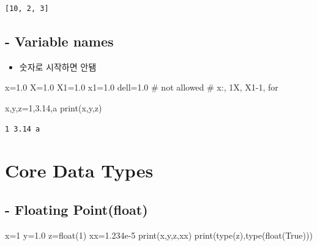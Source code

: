 \documentclass[
  letterpaper,
  DIV=11,
  numbers=noendperiod]{scrreprt}
\newenvironment{Shaded}{\begin{snugshade}}{\end{snugshade}}
\newcommand{\BuiltInTok}[1]{\textcolor[rgb]{0.00,0.23,0.31}{#1}}
\newcommand{\CommentTok}[1]{\textcolor[rgb]{0.37,0.37,0.37}{#1}}
\newcommand{\DecValTok}[1]{\textcolor[rgb]{0.68,0.00,0.00}{#1}}
\newcommand{\FloatTok}[1]{\textcolor[rgb]{0.68,0.00,0.00}{#1}}
\newcommand{\NormalTok}[1]{\textcolor[rgb]{0.00,0.23,0.31}{#1}}
\newcommand{\OperatorTok}[1]{\textcolor[rgb]{0.37,0.37,0.37}{#1}}
\newcommand{\StringTok}[1]{\textcolor[rgb]{0.13,0.47,0.30}{#1}}
\newcommand{\VariableTok}[1]{\textcolor[rgb]{0.07,0.07,0.07}{#1}}
\providecommand{\tightlist}{%
  \setlength{\itemsep}{0pt}\setlength{\parskip}{0pt}}\usepackage{longtable,booktabs,array}
\begin{document}
\begin{verbatim}
[10, 2, 3]
\end{verbatim}

\subsection{- Variable names}\label{variable-names}

\begin{itemize}
\tightlist
\item
  숫자로 시작하면 안됌
\end{itemize}

\begin{Shaded}
\begin{Highlighting}[]
\NormalTok{x}\OperatorTok{=}\FloatTok{1.0}
\NormalTok{X}\OperatorTok{=}\FloatTok{1.0}
\NormalTok{X1}\OperatorTok{=}\FloatTok{1.0}
\NormalTok{x1}\OperatorTok{=}\FloatTok{1.0}
\NormalTok{dell}\OperatorTok{=}\FloatTok{1.0}
\CommentTok{\# not allowed}
\CommentTok{\# x:, 1X, X1{-}1, for}
\end{Highlighting}
\end{Shaded}

\begin{Shaded}
\begin{Highlighting}[]
\NormalTok{x,y,z}\OperatorTok{=}\DecValTok{1}\NormalTok{,}\FloatTok{3.14}\NormalTok{,}\StringTok{\textquotesingle{}a\textquotesingle{}}
\BuiltInTok{print}\NormalTok{(x,y,z)}
\end{Highlighting}
\end{Shaded}

\begin{verbatim}
1 3.14 a
\end{verbatim}

\section{Core Data Types}\label{core-data-types}

\subsection{- Floating Point(float)}\label{floating-pointfloat}

\begin{Shaded}
\begin{Highlighting}[]
\NormalTok{x}\OperatorTok{=}\DecValTok{1}
\NormalTok{y}\OperatorTok{=}\FloatTok{1.0}
\NormalTok{z}\OperatorTok{=}\BuiltInTok{float}\NormalTok{(}\DecValTok{1}\NormalTok{)}
\NormalTok{xx}\OperatorTok{=}\FloatTok{1.234e{-}5}
\BuiltInTok{print}\NormalTok{(x,y,z,xx)}
\BuiltInTok{print}\NormalTok{(}\BuiltInTok{type}\NormalTok{(z),}\BuiltInTok{type}\NormalTok{(}\BuiltInTok{float}\NormalTok{(}\VariableTok{True}\NormalTok{)))}
\end{Highlighting}
\end{Shaded}
\end{document}
